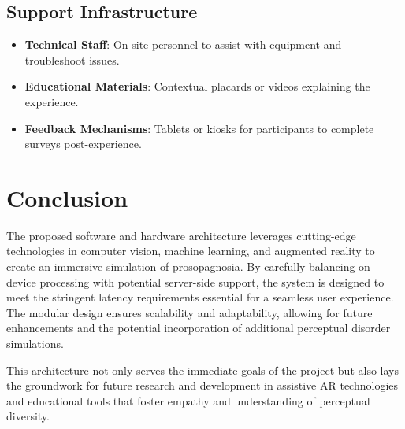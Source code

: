 \documentclass{article}
\begin{document}
\subsection{Support Infrastructure}

\begin{itemize}
    \item \textbf{Technical Staff}: On-site personnel to assist with equipment and troubleshoot issues.
    \item \textbf{Educational Materials}: Contextual placards or videos explaining the experience.
    \item \textbf{Feedback Mechanisms}: Tablets or kiosks for participants to complete surveys post-experience.
\end{itemize}

\section{Conclusion}

The proposed software and hardware architecture leverages cutting-edge technologies in computer vision, machine learning, and augmented reality to create an immersive simulation of prosopagnosia. By carefully balancing on-device processing with potential server-side support, the system is designed to meet the stringent latency requirements essential for a seamless user experience. The modular design ensures scalability and adaptability, allowing for future enhancements and the potential incorporation of additional perceptual disorder simulations.

This architecture not only serves the immediate goals of the project but also lays the groundwork for future research and development in assistive AR technologies and educational tools that foster empathy and understanding of perceptual diversity.

\printbibliography
\end{document}
